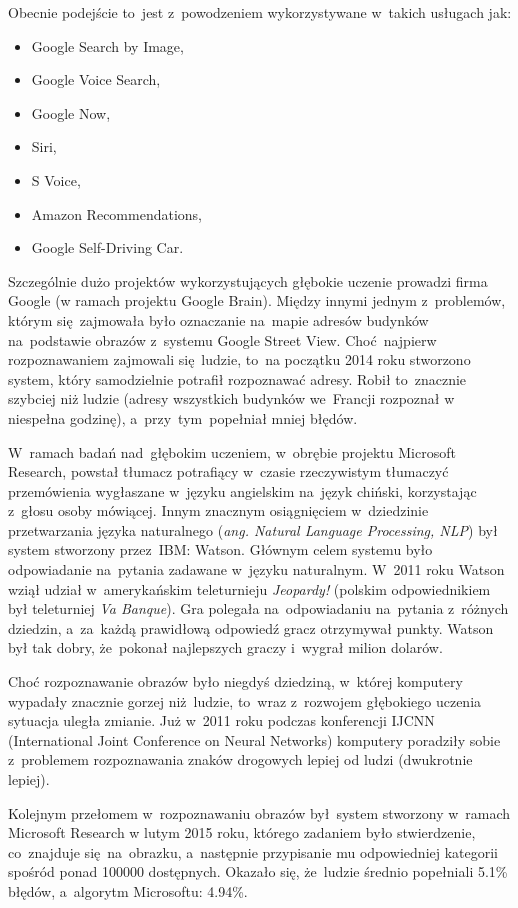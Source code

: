 Obecnie podejście to~jest z~powodzeniem wykorzystywane w~takich usługach jak:
\begin{itemize}
  \item Google Search by Image,
  \item Google Voice Search,
  \item Google Now,
  \item Siri,
  \item S Voice,
  \item Amazon Recommendations,
  \item Google Self-Driving Car.
\end{itemize}

Szczególnie dużo projektów wykorzystujących głębokie uczenie prowadzi firma
Google (w ramach projektu Google Brain). Między innymi jednym z~problemów,
którym się~zajmowała było oznaczanie na~mapie adresów budynków na~podstawie
obrazów z~systemu Google Street View. Choć~najpierw rozpoznawaniem zajmowali
się~ludzie, to~na początku 2014 roku stworzono system, który
samodzielnie potrafił rozpoznawać adresy. Robił to~znacznie szybciej niż ludzie
(adresy wszystkich budynków we~Francji rozpoznał w niespełna godzinę),
a~przy~tym~popełniał mniej błędów.

W~ramach badań nad~głębokim uczeniem, w~obrębie projektu Microsoft Research,
powstał tłumacz potrafiący w~czasie rzeczywistym tłumaczyć przemówienia
wygłaszane w~języku angielskim na~język chiński, korzystając z~głosu
osoby mówiącej. Innym znacznym osiągnięciem w~dziedzinie przetwarzania języka naturalnego (\textit{ang.
Natural Language Processing, NLP}) był system stworzony przez~IBM: Watson.
Głównym celem systemu było odpowiadanie na~pytania zadawane w~języku naturalnym.
W~2011 roku Watson wziął udział w~amerykańskim teleturnieju \textit{Jeopardy!} (polskim odpowiednikiem był
teleturniej \textit{Va Banque}). Gra polegała na~odpowiadaniu na~pytania z~różnych dziedzin, a~za~każdą
prawidłową odpowiedź gracz otrzymywał punkty. Watson był tak dobry, że~pokonał najlepszych graczy i~wygrał
milion dolarów.

Choć rozpoznawanie obrazów było niegdyś dziedziną, w~której komputery wypadały
znacznie gorzej niż~ludzie, to~wraz z~rozwojem głębokiego uczenia sytuacja
uległa zmianie. Już w~2011 roku podczas konferencji IJCNN (International Joint
Conference on Neural Networks) komputery poradziły sobie z~problemem
rozpoznawania znaków drogowych lepiej od ludzi (dwukrotnie lepiej).

Kolejnym przełomem w~rozpoznawaniu obrazów był~system stworzony w~ramach
Microsoft Research w lutym 2015 roku, którego zadaniem było stwierdzenie,
co~znajduje się~na~obrazku, a~następnie przypisanie mu odpowiedniej kategorii spośród
ponad 100000 dostępnych. Okazało się, że~ludzie średnio popełniali 5.1\% błędów,
a~algorytm Microsoftu: 4.94\%.

